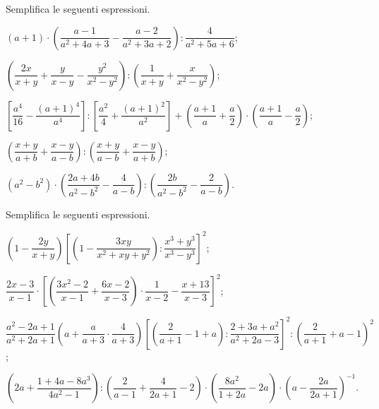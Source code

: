 \begin{esercizio}[\Ast]
\label{ese:14.61}
Semplifica le seguenti espressioni.
\begin{enumeratea}
 \item $(a+1)\cdot\left(\dfrac{a-1}{a^{2}+4a+3}-\dfrac{a-2}{a^{2}+3a+2}\right):\dfrac{4}{a^{2}+5a+6}$;
 \item $\left(\dfrac{2x}{x+y}+\dfrac{y}{x-y}-\dfrac{y^{2}}{x^{2}-y^{2}}\right):\left(\dfrac{1}{x+y}+\dfrac{x}{x^{2}-y^{2}}\right)$;
 \item $\left[\dfrac{a^{4}}{16}-\dfrac{(a+1)^{4}}{a^{4}}\right]:\left[\dfrac{a^{2}}{4}+\dfrac{(a+1)^{2}}{a^{2}}\right]+\left(\dfrac{a+1}{a}+\dfrac{a}{2}\right)\cdot\left(\dfrac{a+1}{a}-\dfrac{a}{2}\right)$;
 \item $\left(\dfrac{x+y}{a+b}+\dfrac{x-y}{a-b}\right):\left(\dfrac{x+y}{a-b}+\dfrac{x-y}{a+b}\right)$;
 \item $\left(a^{2}-b^{2}\right)\cdot\left(\dfrac{2a+4b}{a^{2}-b^{2}}-\dfrac{4}{a-b}\right):\left(\dfrac{2b}{a^{2}-b^{2}}-\dfrac{2}{a-b}\right)$.
\end{enumeratea}
\end{esercizio}

\begin{esercizio}[\Ast]
\label{ese:14.62}
Semplifica le seguenti espressioni.
\begin{enumeratea}
 \item $\left(1-\dfrac{2y}{x+y}\right)\left[\left(1-\dfrac{3xy}{x^{2}+xy+y^{2}}\right):\dfrac{x^{3}+y^{3}}{x^{3}-y^{3}}\right]^{2}$;
 \item $\dfrac{2x-3}{x-1}\cdot \left[\left(\dfrac{3x^{2}-2}{x-1}+\dfrac{6x-2}{x-3}\right)\cdot {\dfrac{1}{x-2}}-\dfrac{x+13}{x-3}\right]^{2}$;
 \item $\dfrac{a^{2}-2a+1}{a^{2}+2a+1}\left(a+\dfrac{a}{a+3}\cdot {\dfrac{4}{a+3}}\right)\left[\left(\dfrac{2}{a+1}-1+a\right):\dfrac{2+3a+a^{2}}{a^{2}+2a-3}\right]^{2}:\left(\dfrac{2}{a+1}+a-1\right)^{2}$;
 \item $\left(2a+\dfrac{1+4a-8a^{3}}{4a^{2}-1}\right):\left(\dfrac{2}{a-1}+\dfrac{4}{2a+1}-2\right)\cdot \left(\dfrac{8a^{2}}{1+2a}-2a\right)\cdot \left(a-\dfrac{2a}{2a+1}\right)^{-1}$.
\end{enumeratea}
\end{esercizio}
\pagebreak

